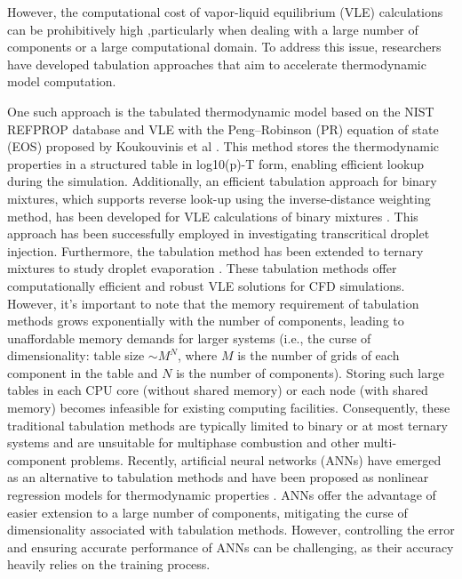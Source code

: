 However, the computational cost of vapor-liquid equilibrium (VLE) calculations can be prohibitively high \cite{yi2019numerical,yang2020real}%
,particularly when dealing with a large number of components or a large computational domain. To address this issue, researchers have developed tabulation approaches that aim to accelerate thermodynamic model computation.
 
One such approach is the tabulated thermodynamic model based on the NIST REFPROP database and VLE with the Peng–Robinson (PR) equation of state (EOS) proposed by Koukouvinis et al \cite{koukouvinis2020high}. This method stores the thermodynamic properties in a structured table in log10(p)-T form, enabling efficient lookup during the simulation.
Additionally, an efficient tabulation approach for binary mixtures, which supports reverse look-up using the inverse-distance weighting method, has been developed for VLE calculations of binary mixtures \cite{yi2019numerical,jafari2021towards,jafari2022exploring}. This approach has been successfully employed in investigating transcritical droplet injection. Furthermore, the tabulation method has been extended to ternary mixtures to study droplet evaporation \cite{gaballa2022numerical}. %
These tabulation methods offer computationally efficient and robust VLE solutions for CFD simulations. However, it's important to note that the memory requirement of tabulation methods grows exponentially with the number of components, leading to unaffordable memory demands for larger systems (i.e., the curse of dimensionality: table size $\sim M^N$, where $M$ is the number of grids of each component in the table and $N$ is the number of components). %
Storing such large tables in each CPU core (without shared memory) or each node (with shared memory) becomes infeasible for existing computing facilities. Consequently, these traditional tabulation methods are typically limited to binary or at most ternary systems and are unsuitable for multiphase combustion and other multi-component problems. Recently, artificial neural networks (ANNs) have emerged as an alternative to tabulation methods and have been proposed as nonlinear regression models for thermodynamic properties \cite{wang2019accelerating,koukouvinis2022machine}. ANNs offer the advantage of easier extension to a large number of components, mitigating the curse of dimensionality associated with tabulation methods. However, controlling the error and ensuring accurate performance of ANNs can be challenging, as their accuracy heavily relies on the training process.


